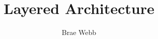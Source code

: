 \documentclass{csse4400}
\title{Layered Architecture}
\author{Brae Webb}
\date{\week{2}}
\begin{document}
\makecover





\end{document}
